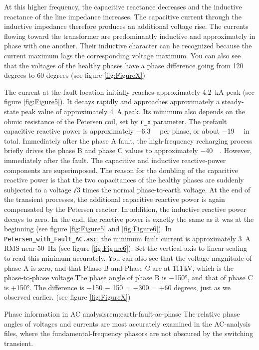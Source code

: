 At this higher frequency, the capacitive reactance decreases and the
inductive reactance of the line impedance increases. The capacitive current
through the inductive impedance therefore produces an additional voltage rise.
The currents flowing toward the transformer are predominantly inductive and
approximately in phase with one another. Their inductive character can be
recognized because the current maximum lags the corresponding voltage maximum.
You can also see that the voltages of the healthy phases have a phase difference going from
120 degrees to 60 degrees (see figure \ref{fig:FigureX})

The current at the fault location initially reaches approximately
\SI{4.2}{\kilo\ampere} peak (see figure \ref{fig:Figure5}). It decays rapidly and approaches approximately a steady-state peak value of approximately \SI{4}{\ampere} peak. Its minimum also depends on the ohmic resistance of the Petersen coil, set by \texttt{r\_x} parameter.
The prefault capacitive reactive power is approximately \SI{-6.3}{\mega\varunit} per phase, or about
\SI{-19}{\mega\varunit} in total. Immediately after the phase A fault, the
high-frequency recharging process briefly drives the phase B and phase C
values to approximately \SI{-40}{\mega\varunit}. However, immediately after the fault. The capacitive and inductive reactive-power components are superimposed. The reason for the doubling of the capacitive reactive power is that the two
capacitances of the healthy phases are suddenly subjected to a voltage √3 times the normal phase-to-earth voltage. At the end of the transient processes, the additional capacitive reactive power is again compensated by the Petersen reactor. In addition, the inductive reactive power decays to zero. In the end, the reactive power is exactly the same as it was at the beginning (see figure \ref{fig:Figure5} and \ref{fig:Figure6}). In \texttt{Petersen\_with\_Fault\_AC.asc}, the minimum fault
current is approximately \SI{3}{\ampere} RMS near \SI{50}{\hertz} (see figure \ref{fig:Figure6}). Set the vertical axis to linear scaling to read this minimum accurately.
You can also see that the voltage magnitude of phase A is zero, and that Phase B and Phase C are at 111 kV, which is the phase‑to‑phase voltage.The phase angle of phase B is −150°, and that of phase C is +150°. The difference is −150 − 150 = −300 = +60 degrees, just as we observed earlier. (see figure \ref{fig:FigureX})


 


\begin{remark}{Phase information in AC analysis}{rem:earth-fault-ac-phase}
The relative phase angles of voltages and currents are most accurately
examined in the AC-analysis files, where the fundamental-frequency phasors are
not obscured by the switching transient.
\end{remark}

